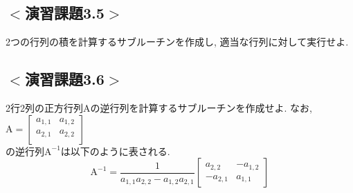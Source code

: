 

\subsection*{$<$演習課題3.5$>$}
2つの行列の積を計算するサブルーチンを作成し, 適当な行列に対して実行せよ.

\subsection*{$<$演習課題3.6$>$}
2行2列の正方行列$\mathrm{A}$の逆行列を計算するサブルーチンを作成せよ.
なお,
$\mathrm{A} =
\begin{bmatrix}
  a_{1,1} & a_{1,2} \\
  a_{2,1} & a_{2,2} \\
\end{bmatrix}
$\\
の逆行列$\mathrm{A}^{-1}$は以下のように表される.
\begin{equation}
\mathrm{A}^{-1} = \frac{1}{a_{1,1}a_{2,2}-a_{1,2}a_{2,1}}
\begin{bmatrix}
  a_{2,2} & -a_{1,2}\\
  -a_{2,1} & a_{1,1}
\end{bmatrix}
\end{equation}


